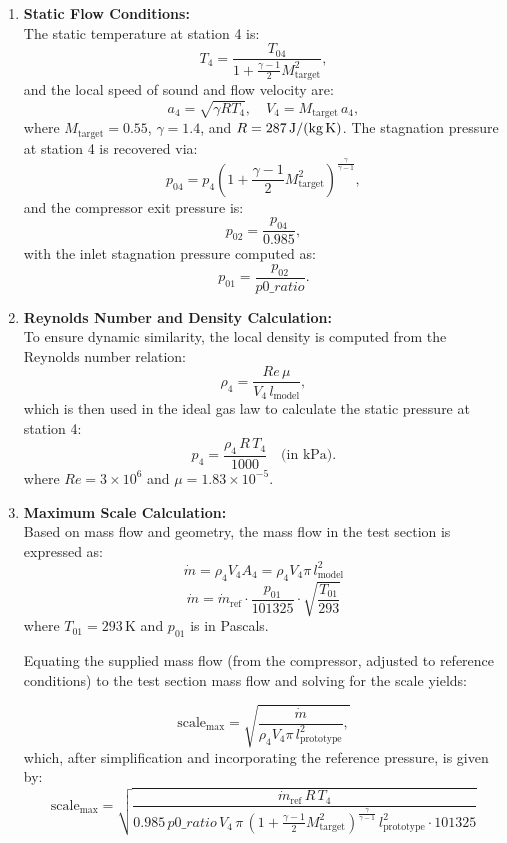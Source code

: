\documentclass[12pt]{article}
\begin{document}
\begin{enumerate}
    \item \textbf{Static Flow Conditions:} \\
    The static temperature at station 4 is:
    \[
    T_{4} = \frac{T_{04}}{1+\frac{\gamma-1}{2}M_{\text{target}}^2},
    \]
    and the local speed of sound and flow velocity are:
    \[
    a_{4} = \sqrt{\gamma R T_{4}}, \quad V_{4} = M_{\text{target}}\,a_{4},
    \]
    where \(M_{\text{target}}=0.55\), \(\gamma = 1.4\), and \(R = 287\,\text{J/(kg\,K)}\).
    The stagnation pressure at station 4 is recovered via:
    \[
    p_{04} = p_{4}\left(1+\frac{\gamma-1}{2}M_{\text{target}}^2\right)^{\frac{\gamma}{\gamma-1}},
    \]
    and the compressor exit pressure is:
    \[
    p_{02} = \frac{p_{04}}{0.985},
    \]
    with the inlet stagnation pressure computed as:
    \[
    p_{01} = \frac{p_{02}}{p0\_ratio}.
    \]
    \item \textbf{Reynolds Number and Density Calculation:} \\
    To ensure dynamic similarity, the local density is computed from the Reynolds number relation:
    \[
    \rho_{4} = \frac{Re\,\mu}{V_{4}\,l_{\text{model}}},
    \]
    which is then used in the ideal gas law to calculate the static pressure at station 4:
    \[
    p_{4} = \frac{\rho_{4}\,R\,T_{4}}{1000}\quad\text{(in kPa)}.
    \]
    where \(Re = 3\times10^6\) and \(\mu = 1.83\times10^{-5}\).
    \item \textbf{Maximum Scale Calculation:} \\
    Based on mass flow and geometry, the mass flow in the test section is expressed as:
   \[
\dot{m} = \rho_{4} V_{4} A_{4} = \rho_{4} V_{4} \pi\, l_{\text{model}}^{2}
\]
\[
\dot{m} = \dot{m}_{\text{ref}} \cdot \frac{p_{01}}{101325} \cdot \sqrt{\frac{T_{01}}{293}}
\]
where \( T_{01} = 293\,\text{K} \) and \( p_{01} \) is in Pascals.

Equating the supplied mass flow (from the compressor, adjusted to reference conditions) to the test section mass flow and solving for the scale yields:

    \[
    \text{scale}_{\text{max}} = \sqrt{\frac{\dot{m}}{\rho_{4}V_{4}\pi\,l_{\text{prototype}}^{2}},
    }
    \]
    which, after simplification and incorporating the reference pressure, is given by:
\[
\text{scale}_{\text{max}} = \sqrt{ \frac{ \dot{m}_{\text{ref}} \, R \, T_{4} }{ 0.985 \, p0\_ratio \, V_{4} \, \pi \, \left(1 + \frac{\gamma - 1}{2} M_{\text{target}}^2\right)^{\frac{\gamma}{\gamma - 1}} \, l_{\text{prototype}}^{2} \cdot 101325 } }
\]


\end{enumerate}
\end{document}
